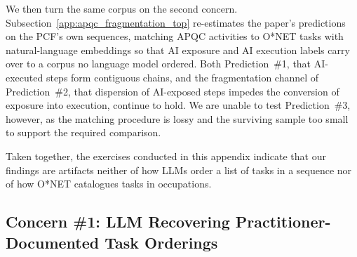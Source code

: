 We then turn the same corpus on the second concern.
Subsection~\ref{app:apqc_fragmentation_top} re-estimates the paper's predictions on the PCF's own sequences,
matching APQC activities to O*NET tasks with natural-language embeddings so that AI exposure and AI execution labels carry over to a corpus no language model ordered.
Both Prediction~\#1, that AI-executed steps form contiguous chains, and the fragmentation channel of
Prediction~\#2, that dispersion of AI-exposed steps impedes the conversion of exposure into execution,
continue to hold.
We are unable to test Prediction~\#3, however, as the matching procedure is lossy and the surviving sample too small to support
the required comparison.

Taken together, the exercises conducted in this appendix indicate that our findings are artifacts neither of how LLMs
order a list of tasks in a sequence nor of how O*NET catalogues tasks in occupations.

\subsection{Concern \#1: LLM Recovering Practitioner-Documented Task Orderings}
\label{app:apqc_validation}

